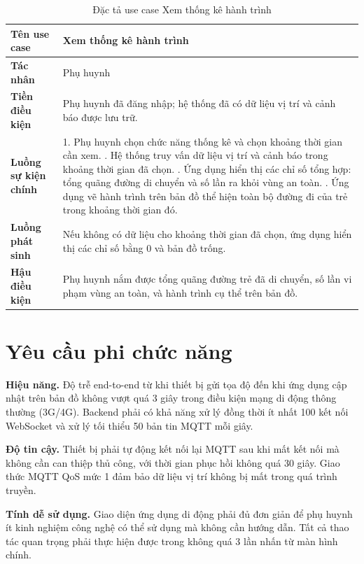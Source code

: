 \documentclass[../DoAn.tex]{subfiles}
\begin{document}
\begin{table}[H]
\centering
\caption{Đặc tả use case Xem thống kê hành trình}
\label{table:uc_stats}
\begin{tabular}{|l|p{9.5cm}|}
\hline
\textbf{Tên use case}       & Xem thống kê hành trình \\
\hline
\textbf{Tác nhân}           & Phụ huynh \\
\hline
\textbf{Tiền điều kiện}     & Phụ huynh đã đăng nhập; hệ thống đã có dữ liệu vị trí và cảnh báo được lưu trữ. \\
\hline
\textbf{Luồng sự kiện chính} &
1. Phụ huynh chọn chức năng thống kê và chọn khoảng thời gian cần xem. \newline
2. Hệ thống truy vấn dữ liệu vị trí và cảnh báo trong khoảng thời gian đã chọn. \newline
3. Ứng dụng hiển thị các chỉ số tổng hợp: tổng quãng đường di chuyển và số lần ra khỏi vùng an toàn. \newline
4. Ứng dụng vẽ hành trình trên bản đồ thể hiện toàn bộ đường đi của trẻ trong khoảng thời gian đó. \\
\hline
\textbf{Luồng phát sinh}    & Nếu không có dữ liệu cho khoảng thời gian đã chọn, ứng dụng hiển thị các chỉ số bằng 0 và bản đồ trống. \\
\hline
\textbf{Hậu điều kiện}      & Phụ huynh nắm được tổng quãng đường trẻ đã di chuyển, số lần vi phạm vùng an toàn, và hành trình cụ thể trên bản đồ. \\
\hline
\end{tabular}
\end{table}

\section{Yêu cầu phi chức năng}
\label{section:2.4}

\textbf{Hiệu năng.} Độ trễ end-to-end từ khi thiết bị gửi tọa độ đến khi ứng dụng cập nhật trên bản đồ không vượt quá 3 giây trong điều kiện mạng di động thông thường (3G/4G). Backend phải có khả năng xử lý đồng thời ít nhất 100 kết nối WebSocket và xử lý tối thiểu 50 bản tin MQTT mỗi giây.

\textbf{Độ tin cậy.} Thiết bị phải tự động kết nối lại MQTT sau khi mất kết nối mà không cần can thiệp thủ công, với thời gian phục hồi không quá 30 giây. Giao thức MQTT QoS mức 1 đảm bảo dữ liệu vị trí không bị mất trong quá trình truyền.

\textbf{Tính dễ sử dụng.} Giao diện ứng dụng di động phải đủ đơn giản để phụ huynh ít kinh nghiệm công nghệ có thể sử dụng mà không cần hướng dẫn. Tất cả thao tác quan trọng phải thực hiện được trong không quá 3 lần nhấn từ màn hình chính.
\end{document}
